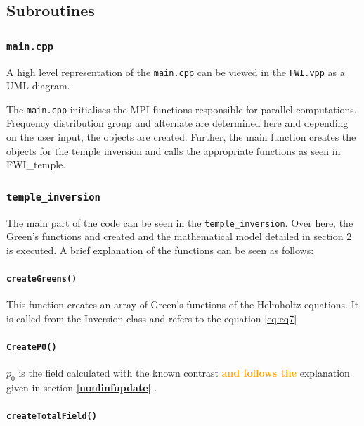 \documentclass[10pt,a4paper]{article}
\newcommand{\newstmtwo}[1]{\textcolor{orange}{\textbf{#1}}}
\newcommand{\oldstmtwo}[1]{\xout{#1}}
\begin{document}
\subsection{Subroutines}
\subsubsection{\texttt{main.cpp}}

A high level representation of the \texttt{main.cpp} can be viewed in
the \texttt{FWI.vpp} as a UML diagram.
\newline

The \texttt{main.cpp} initialises the MPI functions responsible for parallel
computations. Frequency distribution group and alternate are
determined here and depending on the user input, the objects are
created. Further, the main function creates the objects for the temple
inversion and calls the appropriate functions as seen in FWI\_temple.

\subsubsection{\texttt{temple\_inversion}}

The main part of the code can be seen in the
\texttt{temple\_inversion}. Over here, the Green's functions and
created and the mathematical model detailed in section 2 is executed.
A brief explanation of the functions can be seen as follows:

\paragraph{\texttt{createGreens()}}

This function creates an array of Green's functions of the  Helmholtz
equations. It is called from the Inversion class and refers to the
equation \ref{eq:eq7}

\paragraph{\texttt{CreateP0()}}
$p_0$ is the field calculated with the known contrast \oldstmtwo{and due to the} \newstmtwo{and follows the}
explanation given in section \newstmtwo{\ref{nonlinfupdate}} \oldstmtwo{2.6}.

\paragraph{\texttt{createTotalField()}}
\end{document}
